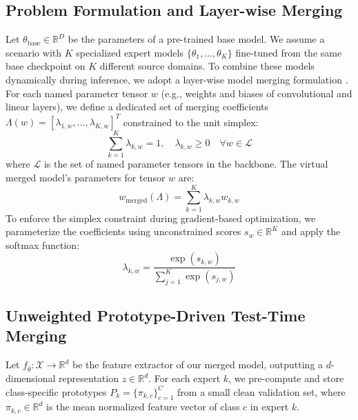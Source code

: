 \documentclass{article}
\theoremstyle{plain}
\theoremstyle{definition}
\theoremstyle{remark}
\begin{document}
\subsection{Problem Formulation and Layer-wise Merging}
Let $\theta_{\text{base}} \in \mathbb{R}^D$ be the parameters of a pre-trained base model. We assume a scenario with $K$ specialized expert models $\{\theta_1, \dots, \theta_K\}$ fine-tuned from the same base checkpoint on $K$ different source domains. To combine these models dynamically during inference, we adopt a layer-wise model merging formulation \citep{yang2024adamerging}. For each named parameter tensor $w$ (e.g., weights and biases of convolutional and linear layers), we define a dedicated set of merging coefficients $\Lambda(w) = [\lambda_{1, w}, \dots, \lambda_{K, w}]^T$ constrained to the unit simplex:
\begin{equation}
    \sum_{k=1}^K \lambda_{k, w} = 1, \quad \lambda_{k, w} \ge 0 \quad \forall w \in \mathcal{L}
\end{equation}
where $\mathcal{L}$ is the set of named parameter tensors in the backbone. The virtual merged model's parameters for tensor $w$ are:
\begin{equation}
    w_{\text{merged}}(\Lambda) = \sum_{k=1}^K \lambda_{k, w} w_{k, w}
\end{equation}
To enforce the simplex constraint during gradient-based optimization, we parameterize the coefficients using unconstrained scores $s_w \in \mathbb{R}^K$ and apply the softmax function:
\begin{equation}
    \lambda_{k, w} = \frac{\exp(s_{k, w})}{\sum_{j=1}^K \exp(s_{j, w})}
\end{equation}

\subsection{Unweighted Prototype-Driven Test-Time Merging}
Let $f_{\bar{\theta}}: \mathcal{X} \rightarrow \mathbb{R}^d$ be the feature extractor of our merged model, outputting a $d$-dimensional representation $z \in \mathbb{R}^d$. For each expert $k$, we pre-compute and store class-specific prototypes $P_k = \{\pi_{k, c}\}_{c=1}^C$ from a small clean validation set, where $\pi_{k, c} \in \mathbb{R}^d$ is the mean normalized feature vector of class $c$ in expert $k$.
\end{document}
